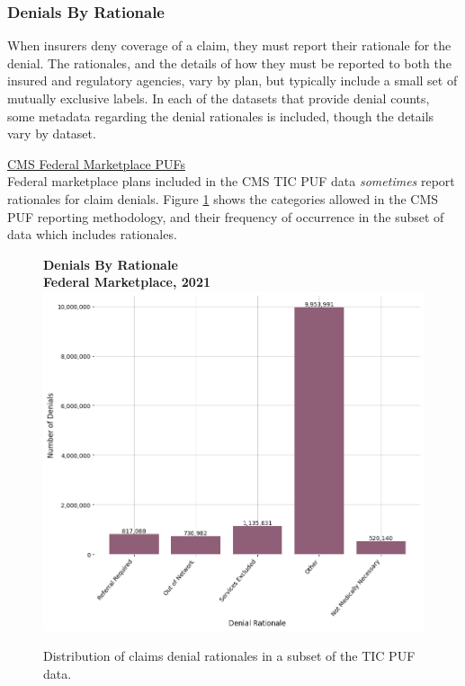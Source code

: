 \documentclass[12pt, a4paper,twoside,parskip=full]{report}
\theoremstyle{plain} %
\theoremstyle{definition} %
\theoremstyle{remark} %
\numberwithin{equation}{chapter}
\begin{document}
		
		\subsubsection{Denials By Rationale}
		
		When insurers deny coverage of a claim, they must report their rationale for the denial. The rationales, and the details of how they must be reported to both the insured and regulatory agencies, vary by plan, but typically include a small set of mutually exclusive labels. In each of the datasets that provide denial counts, some metadata regarding the denial rationales is included, though the details vary by dataset.
		
		\underline{CMS Federal Marketplace PUFs}\\
		
		Federal marketplace plans included in the CMS TIC PUF data \emph{sometimes} report rationales for claim denials. Figure \ref{federalrationaledist} shows the categories allowed in the CMS PUF reporting methodology, and their frequency of occurrence in the subset of data which includes rationales.
		
		\begin{figure}[h!]
			\centering
			\textbf{Denials By Rationale}\\
			\textbf{Federal Marketplace, 2021}\\
			\includegraphics[width=\columnwidth]{images/cms_puf/denials_by_rationale.png}
			\caption{Distribution of claims denial rationales in a subset of the TIC PUF data. }
			\label{federalrationaledist}
		\end{figure}
	
\end{document}
